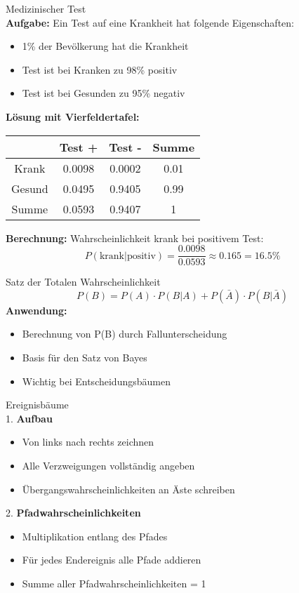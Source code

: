 \begin{example2}{Medizinischer Test}\\
\textbf{Aufgabe:} Ein Test auf eine Krankheit hat folgende Eigenschaften:
\begin{itemize}
\item 1\% der Bevölkerung hat die Krankheit
\item Test ist bei Kranken zu 98\% positiv
\item Test ist bei Gesunden zu 95\% negativ
\end{itemize}

\textbf{Lösung mit Vierfeldertafel:}
\begin{center}
\begin{tabular}{|c|c|c|c|}
\hline
 & Test + & Test - & Summe \\
\hline
Krank & 0.0098 & 0.0002 & 0.01 \\
\hline
Gesund & 0.0495 & 0.9405 & 0.99 \\
\hline
Summe & 0.0593 & 0.9407 & 1 \\
\hline
\end{tabular}
\end{center}

\textbf{Berechnung:} Wahrscheinlichkeit krank bei positivem Test:
$$P(\text{krank}|\text{positiv}) = \frac{0.0098}{0.0593} \approx 0.165 = 16.5\%$$
\end{example2}

\begin{theorem}{Satz der Totalen Wahrscheinlichkeit}
$$P(B)=P(A) \cdot P(B|A)+P(\bar{A}) \cdot P(B|\bar{A})$$
\textbf{Anwendung:}
\begin{itemize}
    \item Berechnung von P(B) durch Fallunterscheidung
    \item Basis für den Satz von Bayes
    \item Wichtig bei Entscheidungsbäumen
\end{itemize}
\end{theorem}

\begin{KR}{Ereignisbäume}\\
1. \textbf{Aufbau}
   \begin{itemize}
   \item Von links nach rechts zeichnen
   \item Alle Verzweigungen vollständig angeben
   \item Übergangswahrscheinlichkeiten an Äste schreiben
   \end{itemize}

2. \textbf{Pfadwahrscheinlichkeiten}
   \begin{itemize}
   \item Multiplikation entlang des Pfades
   \item Für jedes Endereignis alle Pfade addieren
   \item Summe aller Pfadwahrscheinlichkeiten = 1
   \end{itemize}
\end{KR}

